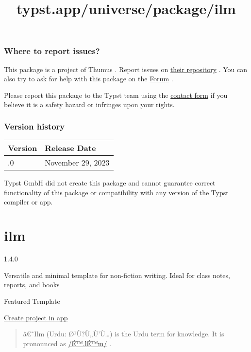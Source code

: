 \subsubsection{Where to report issues?}\label{where-to-report-issues}

This package is a project of Thumus . Report issues on
\href{git@github.com:Thumuss/brainfuck.git}{their repository} . You can
also try to ask for help with this package on the
\href{https://forum.typst.app}{Forum} .

Please report this package to the Typst team using the
\href{https://typst.app/contact}{contact form} if you believe it is a
safety hazard or infringes upon your rights.

\label{versions}
\subsubsection{Version history}\label{version-history}

\begin{longtable}[]{@{}ll@{}}
\toprule\noalign{}
Version & Release Date \\
\midrule\noalign{}
\endhead
\bottomrule\noalign{}
\endlastfoot
1.0.0 & November 29, 2023 \\
\end{longtable}

Typst GmbH did not create this package and cannot guarantee correct
functionality of this package or compatibility with any version of the
Typst compiler or app.


\title{typst.app/universe/package/ilm}

\label{banner}
\label{template-thumbnail}

\section{ilm}\label{ilm}

{ 1.4.0 }

Versatile and minimal template for non-fiction writing. Ideal for class
notes, reports, and books

{ } Featured Template

\href{/app?template=ilm&version=1.4.0}{Create project in app}

\label{readme}
\begin{quote}
â€˜Ilm (Urdu: Ø¹Ù?Ù„Ù'Ù\ldots) is the Urdu term for knowledge. It is
pronounced as
\href{https://en.wiktionary.org/wiki/\%D8\%B9\%D9\%84\%D9\%85\#Urdu}{/É™.lÉ™m/}
.
\end{quote}

